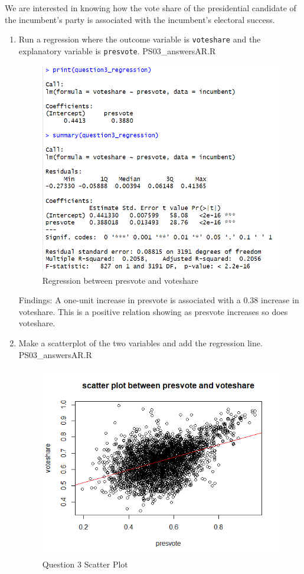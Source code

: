 \documentclass[12pt,letterpaper]{article}
\begin{document}
\noindent We are interested in knowing how the vote share of the presidential candidate of the incumbent's party is associated with the incumbent's electoral success.
	\vspace{.25cm}
	\begin{enumerate}
		\item Run a regression where the outcome variable is \texttt{voteshare} and the explanatory variable is \texttt{presvote}.
		 {PS03_answersAR.R}
		\begin{figure}[h!]\centering
			\caption{\footnotesize Regression between presvote and voteshare}
			\label{}
			\includegraphics[width=.85\textwidth]{question3_regression.png}
		\end{figure}
		Findings: A one-unit increase in presvote is associated with a 0.38 increase in voteshare. This is a positive relation showing as presvote increases so does voteshare.
			\vspace{5cm}
		\item Make a scatterplot of the two variables and add the regression line. 
		 {PS03_answersAR.R}
		\begin{figure}[h!]\centering
			\caption{\footnotesize Question 3 Scatter Plot}
			\label{}
			\includegraphics[width=.85\textwidth]{question3_scatter.png} 

\end{figure}
\end{enumerate}
\end{document}
